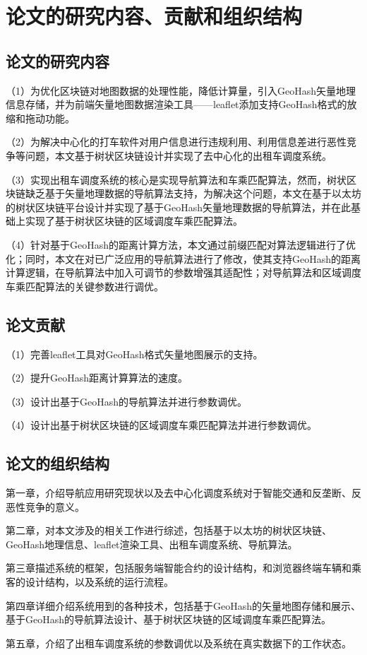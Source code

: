 \section{论文的研究内容、贡献和组织结构}
\subsection{论文的研究内容}
（1）为优化区块链对地图数据的处理性能，降低计算量，引入GeoHash矢量地理信息存储，并为前端矢量地图数据渲染工具——leaflet添加支持GeoHash格式的放缩和拖动功能。\par
（2）为解决中心化的打车软件对用户信息进行违规利用、利用信息差进行恶性竞争等问题，本文基于树状区块链设计并实现了去中心化的出租车调度系统。\par
（3）实现出租车调度系统的核心是实现导航算法和车乘匹配算法，然而，树状区块链缺乏基于矢量地理数据的导航算法支持，为解决这个问题，本文在基于以太坊的树状区块链平台设计并实现了基于GeoHash矢量地理数据的导航算法，并在此基础上实现了基于树状区块链的区域调度车乘匹配算法。\par
（4）针对基于GeoHash的距离计算方法，本文通过前缀匹配对算法逻辑进行了优化；同时，本文在对已广泛应用的导航算法进行了修改，使其支持GeoHash的距离计算逻辑，在导航算法中加入可调节的参数增强其适配性；对导航算法和区域调度车乘匹配算法的关键参数进行调优。
\subsection{论文贡献}
（1）完善leaflet工具对GeoHash格式矢量地图展示的支持。\par
（2）提升GeoHash距离计算算法的速度。\par
（3）设计出基于GeoHash的导航算法并进行参数调优。\par
（4）设计出基于树状区块链的区域调度车乘匹配算法并进行参数调优。
\subsection{论文的组织结构}
第一章，介绍导航应用研究现状以及去中心化调度系统对于智能交通和反垄断、反恶性竞争的意义。\par
第二章，对本文涉及的相关工作进行综述，包括基于以太坊的树状区块链、GeoHash地理信息、leaflet渲染工具、出租车调度系统、导航算法。\par
第三章描述系统的框架，包括服务端智能合约的设计结构，和浏览器终端车辆和乘客的设计结构，以及系统的运行流程。\par
第四章详细介绍系统用到的各种技术，包括基于GeoHash的矢量地图存储和展示、基于GeoHash的导航算法设计、基于树状区块链的区域调度车乘匹配算法。\par
第五章，介绍了出租车调度系统的参数调优以及系统在真实数据下的工作状态。